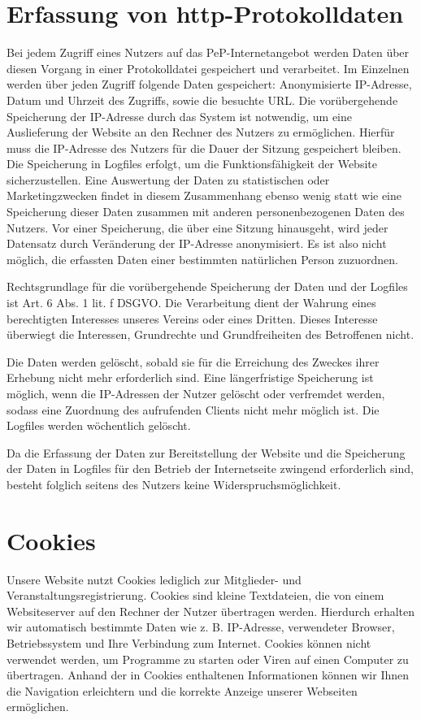 \documentclass[
  fontsize=12pt,
  paper=a4,
  DIV14,
  parskip,
]{scrartcl}
\begin{document}
\section{Erfassung von http-Protokolldaten}

Bei jedem Zugriff eines Nutzers auf das PeP-Internetangebot werden Daten über
diesen Vorgang in einer Protokolldatei gespeichert und verarbeitet.
Im Einzelnen werden über jeden Zugriff folgende Daten gespeichert:
Anonymisierte IP-Adresse, Datum und Uhrzeit des Zugriffs, sowie die besuchte
URL.
Die vorübergehende Speicherung der IP-Adresse durch das System ist notwendig,
um eine Auslieferung der Website an den Rechner des Nutzers zu ermöglichen.
Hierfür muss die IP-Adresse des Nutzers für die Dauer der Sitzung gespeichert
bleiben.
Die Speicherung in Logfiles erfolgt, um die Funktionsfähigkeit der Website
sicherzustellen. Eine Auswertung der Daten zu statistischen oder
Marketingzwecken findet in diesem Zusammenhang ebenso wenig statt wie eine
Speicherung dieser Daten zusammen mit anderen personenbezogenen Daten des
Nutzers.
Vor einer Speicherung, die über eine Sitzung hinausgeht, wird jeder Datensatz
durch Veränderung der IP-Adresse anonymisiert. Es ist also nicht möglich, die
erfassten Daten einer bestimmten natürlichen Person zuzuordnen.

Rechtsgrundlage für die vorübergehende Speicherung der Daten und der Logfiles
ist Art. 6 Abs. 1 lit. f DSGVO. Die Verarbeitung dient der Wahrung eines
berechtigten Interesses unseres Vereins oder eines Dritten. Dieses Interesse
überwiegt die Interessen, Grundrechte und Grundfreiheiten des Betroffenen
nicht.

Die Daten werden gelöscht, sobald sie für die Erreichung des Zweckes ihrer
Erhebung nicht mehr erforderlich sind. Eine längerfristige Speicherung ist
möglich, wenn die IP-Adressen der Nutzer gelöscht oder verfremdet werden,
sodass eine Zuordnung des aufrufenden Clients nicht mehr möglich ist.
Die Logfiles werden wöchentlich gelöscht.

Da die Erfassung der Daten zur Bereitstellung der Website und die Speicherung
der Daten in Logfiles für den Betrieb der Internetseite zwingend erforderlich
sind, besteht folglich seitens des Nutzers keine Widerspruchsmöglichkeit.

\section{Cookies}

Unsere Website nutzt Cookies lediglich zur Mitglieder- und
Veranstaltungsregistrierung. Cookies sind kleine Textdateien, die von einem
Websiteserver auf den Rechner der Nutzer übertragen werden. Hierdurch
erhalten wir automatisch bestimmte Daten wie z. B. IP-Adresse, verwendeter
Browser, Betriebssystem und Ihre Verbindung zum Internet.
Cookies können nicht verwendet werden, um Programme zu starten oder Viren auf
einen Computer zu übertragen. Anhand der in Cookies enthaltenen Informationen
können wir Ihnen die Navigation erleichtern und die korrekte Anzeige unserer
Webseiten ermöglichen.
\end{document}
